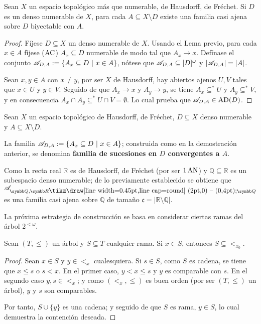 
\begin{proposicion}\label{prop-famSucesiones}
	Sean $X$ un espacio topológico más que numerable, de Hausdorff, de Fréchet. Si $D$ es un denso numerable de $X$, para cada $A \subseteq X \setminus D$ existe una familia casi ajena sobre $D$ biyectable con $A$.
\end{proposicion}

\begin{proof}
	Fíjese $D\subseteq X$ un denso numerable de $X$. Usando el Lema previo, para cada $x \in A$ fíjese ($\operatorname{AC}$) $A_x \subseteq D$ numerable de modo tal que $A_x \to x$. Defínase el conjunto $\mathscr{A}_{D,A}:=\{ A_x \subseteq D \text{ $|$ } x \in A \}$, nótese que $\mathscr{A}_{D,A} \subseteq [D]^\omega$ y $|\mathscr{A}_{D,A}|=|A|$.

	Sean $x,y \in A$ con $x \neq y$, por ser $X$ de Hausdorff, hay abiertos ajenos $U,V$ tales que $x \in U$ y $y \in V$. Seguido de que $A_x \to x$ y $A_y \to y$, se tiene $A_x \subseteq^* U$ y $A_y \subseteq ^* V$, y en consecuencia $A_x \cap A_y \subseteq^* U \cap V = \emptyset$. Lo cual prueba que $\mathscr{A}_{D,A} \in \operatorname{AD}(D)$.
\end{proof}

\begin{definicion}\label{def-FamSucesiones}
	Sean $X$ un espacio topológico de Hausdorff, de Fréchet, $D \subseteq X$ denso numerable y $A \subseteq X \setminus D$.

	La familia $\mathscr{A}_{D,A}:=\{ A_x \subseteq D \text{ $|$ } x \in A \}$; construida como en la demostración anterior, se denomina \textbf{familia de sucesiones en $D$ convergentes a $A$}.
\end{definicion}

Como la recta real $\mathbb{R}$ es de Hausdorff, de Fréchet (por ser $1\operatorname{AN}$) y $\mathbb{Q} \subseteq \mathbb{R}$ es un subespacio denso numerable; de lo previamente establecido se obtiene que $\ms{A}_{\mathbb{Q},\mathbb{R}\setminus \mathbb{Q}}$ es una familia casi ajena sobre $\mathbb{Q}$ de tamaño $\mathfrak{c}=|\mathbb{R} \setminus \mathbb{Q}|$.

La próxima estrategia de construcción se basa en considerar ciertas ramas del árbol $2^{<\omega}$.

\begin{lema}
	Sean $(T,\leq)$ un árbol y $S \subseteq T$ cualquier rama. Si $x \in S$, entonces $S \subseteq <_{x_0}$.
\end{lema}
\begin{proof}
	Sean $x \in S$ y $y \in <_{x}$ cualesquiera. Si $s \in S$, como $S$ es cadena, se tiene que $x \leq s$ o $s < x$. En el primer caso, $y<x\leq s$ y $y$ es comparable con $s$. En el segundo caso $y,s \in <_{x}$; y como $(<_{x},\leq)$ es buen orden (por ser $(T,\leq)$ un árbol), $y$ y $s$ son comparables.

	Por tanto, $S \cup \{y\}$ es una cadena; y seguido de que $S$ es rama, $y \in S$, lo cual demuestra la contención deseada.
\end{proof}

